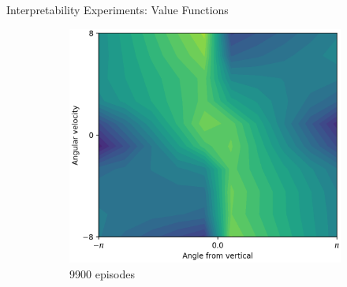 \documentclass{beamer}
\begin{document}
\begin{frame}{Interpretability Experiments: Value Functions}
\begin{figure}[t]
\begin{subfigure}{0.30\linewidth}
      \centering
      \includegraphics[width=0.9\linewidth,trim=0 0 0 0,clip]{assets/ref_plots/value_model_refcolexps_r10c2_1_ep9900}
      \caption{9900 episodes}
    \end{subfigure}
    \begin{subfigure}{0.05\linewidth}
      \vspace{-2em}
      \centering

\end{subfigure}
\end{figure}
\end{frame}
\end{document}
